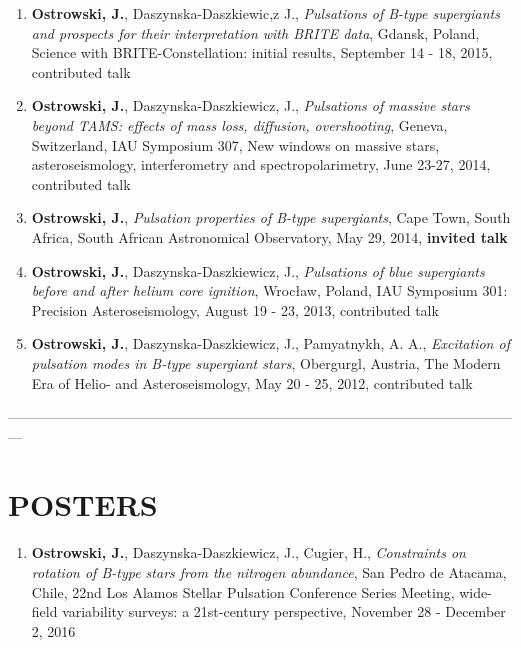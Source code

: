\documentclass[margin, 10pt]{res} %
\begin{document}
\begin{resume}
\begin{enumerate}
    \item \textbf{Ostrowski, J.}, Daszynska-Daszkiewic,z J., \textit{Pulsations of B-type supergiants and prospects for their interpretation with BRITE data}, Gdansk, Poland,  Science with BRITE-Constellation: initial results, September 14 - 18, 2015, contributed talk

    \item \textbf{Ostrowski, J.}, Daszynska-Daszkiewicz, J., \textit{Pulsations of massive stars beyond TAMS: effects of mass loss, diffusion, overshooting}, Geneva, Switzerland, IAU Symposium 307, New windows on massive stars, asteroseismology, interferometry and spectropolarimetry, June 23-27, 2014, contributed talk

    \item \textbf{Ostrowski, J.}, \textit{Pulsation properties of B-type supergiants}, Cape Town, South Africa, South African Astronomical Observatory, May 29, 2014, \textbf{invited talk}

    \item \textbf{Ostrowski, J.}, Daszynska-Daszkiewicz, J., \textit{Pulsations of blue supergiants before and after helium core ignition}, Wroc\l{}aw, Poland, IAU Symposium 301: Precision Asteroseismology, August 19 - 23, 2013, contributed talk

    \item \textbf{Ostrowski, J.}, Daszynska-Daszkiewicz, J., Pamyatnykh, A. A., \textit{Excitation of pulsation modes in B-type supergiant stars}, Obergurgl, Austria, The Modern Era of Helio- and Asteroseismology, May 20 - 25, 2012, contributed talk
\end{enumerate}

---------------------------------------------------------------------------------------------------------------

\section{POSTERS}

\begin{enumerate}

    \item \textbf{Ostrowski, J.}, Daszynska-Daszkiewicz, J., Cugier, H., \textit{Constraints on rotation of B-type stars from the nitrogen abundance}, San Pedro de Atacama, Chile, 22nd Los Alamos Stellar Pulsation Conference Series Meeting, wide-field variability surveys: a 21st-century perspective, November 28 - December 2, 2016


\end{enumerate}
\end{resume}
\end{document}

